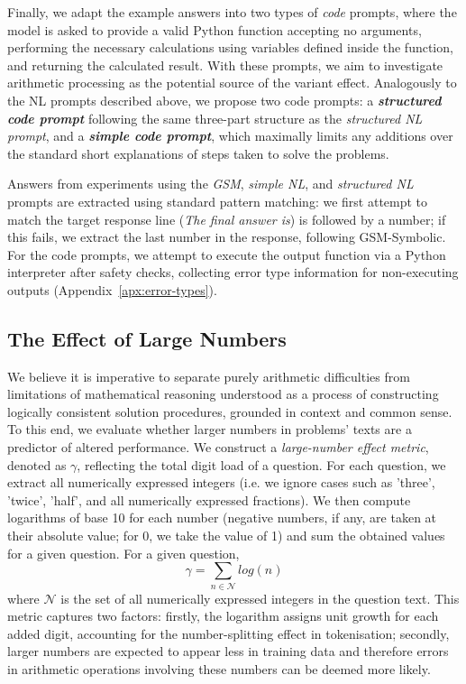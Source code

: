 \documentclass[11pt]{article}
\begin{document}
Finally, we adapt the example answers into two types of \textit{code} prompts, where the model is asked to provide a valid Python function accepting no arguments, performing the necessary calculations using variables defined inside the function, and returning the calculated result. With these prompts, we aim to investigate arithmetic processing as the potential source of the variant effect. Analogously to the NL prompts described above, we propose two code prompts: a \textbf{\textit{structured code prompt}} following the same three-part structure as the \textit{structured NL prompt}, and a \textbf{\textit{simple code prompt}}, which maximally limits any additions over the standard short explanations of steps taken to solve the problems.


Answers from experiments using the \textit{GSM}, \textit{simple NL}, and \textit{structured NL} prompts are extracted using standard pattern matching: we first attempt to match the target response line (\textit{The final answer is}) is followed by a number; if this fails, we extract the last number in the response, following GSM-Symbolic. For the code prompts, we attempt to execute the output function via a Python interpreter after safety checks, collecting error type information for non-executing outputs (Appendix~\ref{apx:error-types}).

\subsection{The Effect of Large Numbers}\label{sec:number-effect}
We believe it is imperative to separate purely arithmetic difficulties from limitations of mathematical reasoning understood as a process of constructing logically consistent solution procedures, grounded in context and common sense.
To this end, we evaluate whether larger numbers in problems' texts are a predictor of altered performance.
We construct a \textit{large-number effect metric}, denoted as $\gamma$, reflecting the total digit load of a question. For each question, we extract all numerically expressed integers (i.e. we ignore cases such as 'three', 'twice', 'half', and all numerically expressed fractions). We then compute logarithms of base 10 for each number (negative numbers, if any, are taken at their absolute value; for 0, we take the value of 1) and sum the obtained values for a given question. For a given question,
\begin{equation}
    \gamma = \sum_{n \in \mathcal{N}} log(n)
\end{equation}
where $\mathcal{N}$ is the set of all numerically expressed integers in the question text. This metric captures two factors: firstly, the logarithm assigns unit growth for each added digit, accounting for the number-splitting effect in tokenisation; secondly, larger numbers are expected to appear less in training data and therefore errors in arithmetic operations involving these numbers can be deemed more likely.
\end{document}

